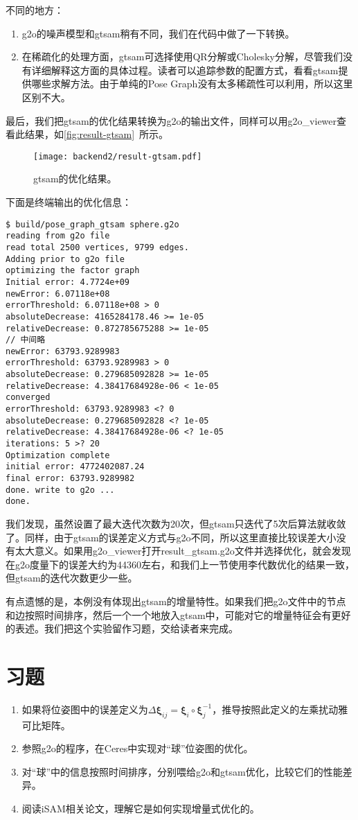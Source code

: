 不同的地方：
\begin{enumerate}
	\item g2o的噪声模型和gtsam稍有不同，我们在代码中做了一下转换。
	\item 在稀疏化的处理方面，gtsam可选择使用QR分解或Cholesky分解，尽管我们没有详细解释这方面的具体过程。读者可以追踪参数的配置方式，看看gtsam提供哪些求解方法。由于单纯的Pose Graph没有太多稀疏性可以利用，所以这里区别不大。
\end{enumerate}

最后，我们把gtsam的优化结果转换为g2o的输出文件，同样可以用g2o\_viewer查看此结果，如\autoref{fig:result-gtsam}~所示。

\begin{figure}[!ht]
	\centering
	\texttt{[image: backend2/result-gtsam.pdf]}
	\caption{gtsam的优化结果。}
	\label{fig:result-gtsam}
\end{figure}

下面是终端输出的优化信息：

\begin{lstlisting}
$ build/pose_graph_gtsam sphere.g2o 
reading from g2o file
read total 2500 vertices, 9799 edges.
Adding prior to g2o file 
optimizing the factor graph
Initial error: 4.7724e+09
newError: 6.07118e+08
errorThreshold: 6.07118e+08 > 0
absoluteDecrease: 4165284178.46 >= 1e-05
relativeDecrease: 0.872785675288 >= 1e-05
// 中间略
newError: 63793.9289983
errorThreshold: 63793.9289983 > 0
absoluteDecrease: 0.279685092828 >= 1e-05
relativeDecrease: 4.38417684928e-06 < 1e-05
converged
errorThreshold: 63793.9289983 <? 0
absoluteDecrease: 0.279685092828 <? 1e-05
relativeDecrease: 4.38417684928e-06 <? 1e-05
iterations: 5 >? 20
Optimization complete
initial error: 4772402087.24
final error: 63793.9289982
done. write to g2o ... 
done.
\end{lstlisting}

我们发现，虽然设置了最大迭代次数为20次，但gtsam只迭代了5次后算法就收敛了。同样，由于gtsam的误差定义方式与g2o不同，所以这里直接比较误差大小没有太大意义。如果用g2o\_viewer打开result\_gtsam.g2o文件并选择优化，就会发现在g2o度量下的误差大约为44360左右，和我们上一节使用李代数优化的结果一致，但gtsam的迭代次数更少一些。

有点遗憾的是，本例没有体现出gtsam的增量特性。如果我们把g2o文件中的节点和边按照时间排序，然后一个一个地放入gtsam中，可能对它的增量特征会有更好的表述。我们把这个实验留作习题，交给读者来完成。

\section*{习题}
\begin{enumerate}
	\item 如果将位姿图中的误差定义为$\Delta \bm{\xi}_{ij} = \bm{\xi}_i \circ \bm{\xi}_j^{-1}$，推导按照此定义的左乘扰动雅可比矩阵。
	\item 参照g2o的程序，在Ceres中实现对“球”位姿图的优化。
	\item 对“球”中的信息按照时间排序，分别喂给g2o和gtsam优化，比较它们的性能差异。
	\item[\optional] 阅读iSAM相关论文，理解它是如何实现增量式优化的。
\end{enumerate}
